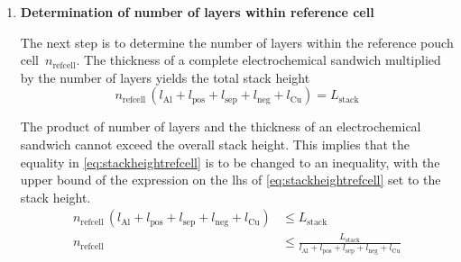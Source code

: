 \begin{enumerate}[ label=\textbf{\arabic*}), leftmargin=0pt, itemindent=20pt, labelwidth=15pt, labelsep=5pt, listparindent=0.7cm, align=left]
        The pouch 
        material itself has a  finite thickness (a value of
        \SI{160}{\milli\meter} is used here; see table note $g$ for this
        entry in \cref{tbl:lcoSimParamslayeropt}) and hence after accounting 
        for this, the stack thickness  available for placement of unit cells is
        smaller than  the pouch thickness.
        \begin{align}
            \text{Stack thickness}, L_\text{stack} & = \text{Pouch height} - 2\times \text{pouch thickness} \\
                                                   & = H_\text{pouch} - 2 T_\text{pouch}                    \\
                                                   & = 10.0 - 2\times(\num{160e-3})                         \\
            L_\text{stack}                         & = \SI{9.68}{\milli\meter}
        \end{align}
        The computed  value of stack  thickness is  held constant for  all layer
        choices trialled in the entire layer optimisation process.

    \item \textbf{Determination of number  of layers within  reference cell}

        The  next  step  is  to  determine  the  number  of  layers  within  the
        reference pouch  cell~$n_\text{refcell}$. The  thickness of  a complete
        electrochemical sandwich multiplied  by the number of  layers yields the
        total stack height
        \begin{equation}\label{eq:stackheightrefcell}
            n_\text{refcell}\, \left(l_\text{Al} + l_\text{pos} + l_\text{sep} + l_\text{neg} + l_\text{Cu}\right) = L_\text{stack}
        \end{equation}

        The product of number of layers  and the thickness of an electrochemical
        sandwich  cannot exceed  the  overall stack  height.  This implies  that
        the  equality in  \cref{eq:stackheightrefcell} is  to be  changed to  an
        inequality, with  the upper bound of  the expression on the  \gls{lhs} of
        \cref{eq:stackheightrefcell} set to the stack height.
        \begin{align}
            n_\text{refcell}\, \left(l_\text{Al} + l_\text{pos} + l_\text{sep} + l_\text{neg} + l_\text{Cu}\right) & \le L_\text{stack} \\
            n_\text{refcell}                                                                            & \le \frac{L_\text{stack}}{l_\text{Al} + l_\text{pos} + l_\text{sep} + l_\text{neg} + l_\text{Cu}}\label{eq:stackheightrefcellmod}
        \end{align}


\end{enumerate}
